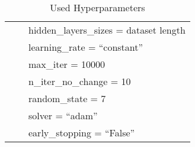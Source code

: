 \begin{table}[H]
\begin{tabular}{lll}
                                            &                           & hidden\_layers\_sizes = dataset length    \\
                                            &                           & learning\_rate = “constant”   \\
                                            &                           & max\_iter = 10000         \\
                                            &                           & n\_iter\_no\_change = 10  \\
                                            &                           & random\_state = 7         \\
                                            &                           & solver = “adam”           \\
                                            &                           & early\_stopping = “False” \\
        \bottomrule
    \end{tabular}
    \caption{Used Hyperparameters}
    \label{tab:Hyperparameters}
\end{table}
